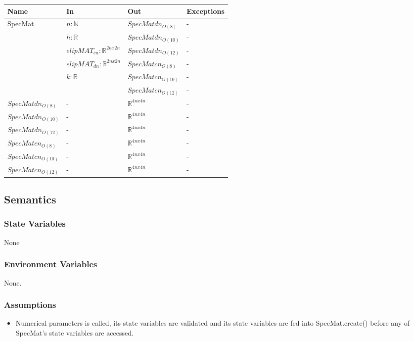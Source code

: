 \documentclass[12pt, titlepage]{article}
\begin{document}
\begin{center}
	\begin{tabular}{p{3cm} p{5cm} p{3cm} >{\raggedright\arraybackslash}p{5cm}}
		\toprule
		\textbf{Name} & \textbf{In} & \textbf{Out} & \textbf{Exceptions} \\
		\hline
		SpecMat & $n : \mathbb{N} $ &$SpecMatdn_{O(8)}$ & - \\ 
		 & $h : \mathbb{R} $& $SpecMatdn_{O(10)}$ & - \\ 
		 & $elipMAT_{cn} : \mathbb{R}^{2nx2n} $ &$SpecMatdn_{O(12)}$ & - \\ 
		 & $elipMAT_{dn} : \mathbb{R}^{2nx2n} $ &$SpecMatcn_{O(8)}$ & - \\ 
		 & $k : \mathbb{R} $ & $SpecMatcn_{O(10)}$& - \\
		 &  &  $SpecMatcn_{O(12)}$ &- \\
		$SpecMatdn_{O(8)}$ & - & $\mathbb{R}^{4nx4n}$ & - \\
		$SpecMatdn_{O(10)}$ & - & $\mathbb{R}^{4nx4n}$ & - \\ 
		$SpecMatdn_{O(12)}$ & - & $\mathbb{R}^{4nx4n}$ & - \\
		$SpecMatcn_{O(8)}$ & - & $\mathbb{R}^{4nx4n}$ & - \\
		$SpecMatcn_{O(10)}$ & - & $\mathbb{R}^{4nx4n}$ & - \\ 
		$SpecMatcn_{O(12)}$ & - & $\mathbb{R}^{4nx4n}$ & - \\
		\hline
	\end{tabular}
\end{center}

\subsection{Semantics}

\subsubsection{State Variables}
None

\subsubsection{Environment Variables}

None. 

\subsubsection{Assumptions}

\begin{itemize}
	\item Numerical parameters is called, its state variables are validated and 
	its state variables are fed into SpecMat.create() before any of SpecMat's 
	state variables are accessed. 
\end{itemize}
\end{document}
